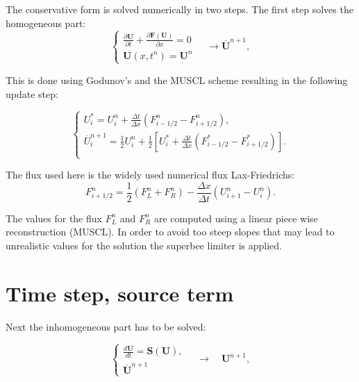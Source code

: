 \documentclass[a4paper, oneside]{discothesis}
\begin{document}
The conservative form is solved numerically in two steps. 
The first step solves the homogeneous part:
\begin{equation}
	\left\{\begin{array}{l}
			\frac{\partial \mathbf{U}}{\partial t}+\frac{\partial \mathbf{F}(\mathbf{U})}{\partial x}=0 \\
			\mathbf{U}\left(x, t^n\right)=\mathbf{U}^n
	\end{array} \quad \rightarrow \overline{\mathbf{U}}^{n+1},\right.
\end{equation}

This is done using Godunov's and the MUSCL scheme resulting in the following update step:

\begin{equation}
	\left\{\begin{array}{l}
			U_i^*=U_i^n+\frac{\Delta t}{\Delta x}\left(F_{i-1 / 2}^n-F_{i+1 / 2}^n\right), \\
			\overline{U}_i^{n+1}=\frac{1}{2} U_i^n+\frac{1}{2}\left[U_i^*+\frac{\Delta t}{\Delta x}\left(F_{i-1 / 2}^*-F_{i+1 / 2}^*\right)\right] .  \\
	\end{array} \right.
\end{equation}
\begin{comment}
	\begin{equation}
		U_i^n \underset{\Delta x \rightarrow 0}{=} \frac{1}{\Delta x} \int_{x_i-\frac{\Delta x}{2}}^{x_i+\frac{\Delta x}{2}} q\left(x, t_n\right) d x
	\end{equation}
\end{comment}

The flux used here is the widely used numerical flux Lax-Friedrichs:
\begin{equation}
	F_{i+1 / 2}^n=\frac{1}{2}\left(F_L^n+F_R^n\right)-\frac{\Delta x}{\Delta t}\left(U_{i+1}^n-U_i^n\right) .
\end{equation}

The values for the flux $F_L^n$ and $F_R^n$ are computed using a linear piece wise reconstruction (MUSCL).
In order to avoid too steep slopes that may lead to unrealistic values for the solution the superbee limiter is applied.


\section{Time step, source term}
Next the inhomogeneous part has to be solved:

\begin{equation}
	\left\{\begin{array}{l}
			\frac{d \mathbf{U}}{d t}=\mathbf{S}(\mathbf{U}), \\
			\overline{\mathbf{U}}^{n+1}
	\end{array} \quad \rightarrow \quad \mathbf{U}^{n+1},\right.
\end{equation}
\end{document}
